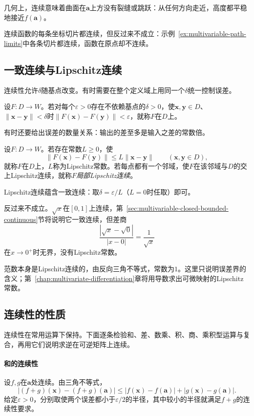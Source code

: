 几何上，连续意味着曲面在$\bm a$上方没有裂缝或跳跃：从任何方向走近，高度都平稳地接近$f(\bm a)$。

连续函数的每条坐标切片都连续，但反过来不成立：示例~\ref{ex:multivariable-path-limits}中各条切片都连续，函数在原点却不连续。

\subsection{一致连续与Lipschitz连续}
\label{sec:multivariable-uniform-lipschitz}

连续性允许$\delta$随基点改变。有时需要在整个定义域上用同一个$\delta$统一控制误差。
\begin{definition}[一致连续]
\label{def:ls-uniform-continuity}
设$F:D\to W$。若对每个$\varepsilon>0$存在不依赖基点的$\delta>0$，使$\bm x,\bm y\in D$、$\lVert\bm x-\bm y\rVert<\delta$时$\lVert F(\bm x)-F(\bm y)\rVert<\varepsilon$，就称$F$在$D$上。
\end{definition}
有时还要给出误差的数量关系：输出的差至多是输入之差的常数倍。
\begin{definition}[Lipschitz连续]
\label{def:ls-lipschitz}
设$F:D\to W$。若存在常数$L\geq0$，使
\[
 \lVert F(\bm x)-F(\bm y)\rVert\leq L\lVert\bm x-\bm y\rVert\qquad(\bm x,\bm y\in D),
\]
就称$F$在$D$上，$L$称为Lipschitz常数。若每点都有一个邻域，使$F$在该邻域与$D$的交上Lipschitz连续，就称$F$\emph{局部Lipschitz连续}。
\end{definition}
Lipschitz连续蕴含一致连续：取$\delta=\varepsilon/L$（$L=0$时任取）即可。

反过来不成立。$\sqrt x$在$[0,1]$上连续，第~\ref{sec:multivariable-closed-bounded-continuous}节将说明它一致连续，但差商
\[
 \frac{|\sqrt x-\sqrt0|}{|x-0|}=\frac1{\sqrt x}
\]
在$x\to0^+$时无界，没有Lipschitz常数。

范数本身是Lipschitz连续的，由反向三角不等式，常数为$1$。这里只说明误差界的含义；第~\ref{chap:multivariate-differentiation}章将用导数求出可微映射的Lipschitz常数。

\subsection{连续性的性质}
\label{sec:multivariable-continuity-properties}

连续性在常用运算下保持。下面逐条检验和、差、数乘、积、商、乘积型运算与复合，再用它们说明求逆在可逆矩阵上连续。

\paragraph{和的连续性}
设$f,g$在$\bm a$处连续。由三角不等式，
\[
 |(f+g)(\bm x)-(f+g)(\bm a)|\leq|f(\bm x)-f(\bm a)|+|g(\bm x)-g(\bm a)|.
\]
给定$\varepsilon>0$，分别取使两个误差都小于$\varepsilon/2$的半径，其中较小的半径就满足$f+g$的连续性要求。

